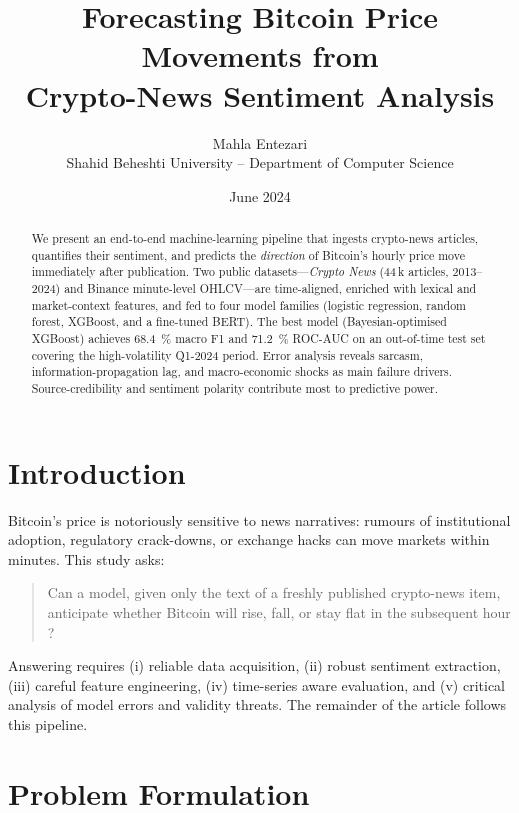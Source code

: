 \documentclass[12pt,a4paper]{article}
\title{\textbf{Forecasting Bitcoin Price Movements from \\
Crypto-News Sentiment Analysis}}
\author{Mahla Entezari\\
\small Shahid Beheshti University – Department of Computer Science}
\date{June 2024}
\begin{document}
\maketitle
\thispagestyle{empty}

\begin{abstract}
\noindent
We present an end-to-end machine-learning pipeline that ingests crypto-news
articles, quantifies their sentiment, and predicts the \emph{direction}
of Bitcoin’s hourly price move immediately after publication.
Two public datasets—\textit{Crypto News} (44\,k articles, 2013–2024)
and Binance minute-level OHLCV—are time-aligned, enriched with lexical
and market-context features, and fed to four model families
(logistic regression, random forest, XGBoost, and a fine-tuned BERT).
The best model (Bayesian-optimised XGBoost) achieves
\SI{68.4}{\percent} macro F1 and \SI{71.2}{\percent} ROC-AUC on an
out-of-time test set covering the high-volatility Q1-2024 period.
Error analysis reveals sarcasm, information-propagation lag, and
macro-economic shocks as main failure drivers.  Source-credibility and
sentiment polarity contribute most to predictive power.
\end{abstract}

\newpage
\tableofcontents
\newpage

\section{Introduction}
Bitcoin’s price is notoriously sensitive to news narratives: rumours of
institutional adoption, regulatory crack-downs, or exchange hacks can
move markets within minutes.  This study asks:

\begin{quote}
Can a model, given only the text of a freshly published
crypto-news item, anticipate whether Bitcoin will rise, fall,
or stay flat in the subsequent hour ?
\end{quote}

Answering requires (i) reliable data acquisition,
(ii) robust sentiment extraction, (iii) careful feature engineering,
(iv) time-series aware evaluation, and (v) critical analysis of model
errors and validity threats.  The remainder of the article follows this
pipeline.

\section{Problem Formulation}
\end{document}
